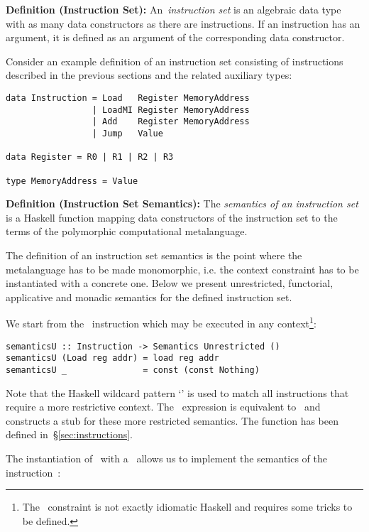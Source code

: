 \textbf{Definition (Instruction Set):} An~\emph{instruction set} is an algebraic
data type with as many data constructors as there are instructions.
If an instruction has an argument, it is defined as an argument of the
corresponding data constructor.

Consider an example definition of an instruction set consisting
of instructions described in the previous sections and the related auxiliary types:

\begin{verbatim}
data Instruction = Load   Register MemoryAddress
                 | LoadMI Register MemoryAddress
                 | Add    Register MemoryAddress
                 | Jump   Value

data Register = R0 | R1 | R2 | R3

type MemoryAddress = Value
\end{verbatim}

\noindent
\textbf{Definition (Instruction Set Semantics):}
The \emph{semantics of an instruction set} is a Haskell function mapping
data constructors of the instruction set to the terms of the polymorphic
computational metalanguage.

The definition of an instruction set semantics is the point where the metalanguage
has to be made monomorphic, i.e. the context constraint has to be instantiated with
a concrete one. Below we present unrestricted, functorial, applicative and
monadic semantics for the defined instruction set.

We start from the~ instruction which may be executed in any
context\footnote{The~ constraint is not exactly idiomatic Haskell and
requires some tricks to be defined.}:

\vspace{-1mm}
\begin{verbatim}
semanticsU :: Instruction -> Semantics Unrestricted ()
semanticsU (Load reg addr) = load reg addr
semanticsU _               = const (const Nothing)
\end{verbatim}

Note that the Haskell wildcard pattern `\hs{_}' is used to match all instructions
that require a more restrictive context. The~ expression
is equivalent to~ and constructs a stub for these
more restricted semantics. The function  has been defined
in~\S\ref{sec:instructions}.

The instantiation of~ with a~ allows us to implement the
semantics of the instruction~:

